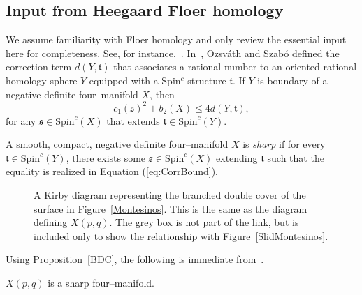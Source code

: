 \subsection{Input from Heegaard Floer homology}

We assume familiarity with Floer homology and only review the essential input here for completeness. See, for instance,~\cite{Ozsvath2004, Ozsvath2004a}. In~\cite{OSzAbGr}, Ozsv\'ath and Szab\'o defined the correction term $d(Y, \mathfrak t)$ that associates a rational number to an oriented rational homology sphere $Y$ equipped with a Spin$^c$ structure $\mathfrak t$. %
If $Y$ is boundary of a negative definite four--manifold $X$, then
\begin{equation}\label{eq:CorrBound}
 c_1(\mathfrak s)^2 + b_2(X)\le 4d(Y, \mathfrak t),
\end{equation}
for any $\mathfrak s \in \text{Spin}^c(X)$ that extends $\mathfrak t \in \text{Spin}^c(Y)$.

\begin{definition}
A smooth, compact, negative definite four--manifold $X$ is {\it sharp} if for every $\mathfrak t \in \text{Spin}^c(Y)$, there exists some $\mathfrak s\in \text{Spin}^c(X)$ extending $\mathfrak t$ such that the equality is realized in Equation (\ref{eq:CorrBound}).
\end{definition}



\begin{figure}

\centering
\def\svgwidth{.8\textwidth}

\caption{A Kirby diagram representing the branched double cover of the surface in Figure~\ref{Montesinos}. This is the same as the diagram defining $X(p,q)$. The grey box is not part of the link, but is included only to show the relationship with Figure~\ref{SlidMontesinos}.}\label{CtypeFromMontesinos}

\end{figure}

Using Proposition~\ref{BDC}, the following is immediate from~\cite[Theorem~3.4]{OSzBrDoub}.

{\lemma \label{XSharp} $X(p,q)$ is a sharp four--manifold.
}


